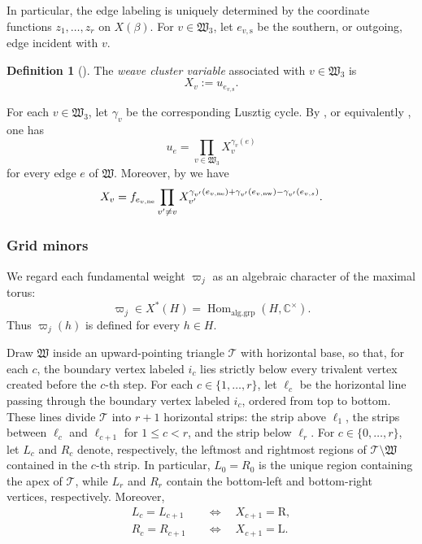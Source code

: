 \documentclass[12pt, reqno]{amsart}
\theoremstyle{plain}
\theoremstyle{definition}
\newtheorem{definition}[theorem]{Definition}
\numberwithin{equation}{section}
\begin{document}
In particular, the edge labeling is uniquely determined by the
coordinate functions \(z_1,\ldots,z_r\) on \(X(\beta)\).
 For \(v\in\mathfrak W_3\), let
\(e_{v,\mathrm{s}}\) be the southern, or outgoing, edge incident with
\(v\).

\begin{definition}[{\cite[Definition~4.4]{casals2025comparing}}]
\label{def:weave-cluster-variable}
The \emph{weave cluster variable} associated with
\(v\in\mathfrak W_3\) is
\[
    X_v
    :=
    u_{e_{v,\mathrm{s}}}.
\]
\end{definition}

For each \(v\in\mathfrak W_3\), let \(\gamma_v\) be the corresponding
Lusztig cycle. By
\cite[Theorem~5.12(i)]{casals2025cluster}, or equivalently
\cite[Theorem~4.19]{casals2025comparing}, one has
\begin{equation}\label{eq:u-factorization}
    u_e
    =
    \prod_{v\in\mathfrak W_3}
    X_v^{\gamma_v(e)}\end{equation}
for every edge \(e\) of \(\mathfrak W\). Moreover, by \cite[equation~(25)]{casals2025cluster} we have 
\begin{equation}
X_v=f_{e_{v,\rm ne}}\prod_{v'\neq v}X_{v'}^{\gamma_{v'}(e_{v,\rm ne})+\gamma_{v'}(e_{v,\rm nw})-\gamma_{v'}(e_{v,s})}.
\end{equation}

\subsubsection{Grid minors}

We regard each fundamental weight
\(\varpi_j\) as an algebraic character of the maximal torus:
\[
    \varpi_j
    \in
    X^*(H)
    =
    \operatorname{Hom}_{\mathrm{alg.grp}}
    (H,\mathbb{C}^{\times}).
\]
Thus \(\varpi_j(h)\) is defined for every \(h\in H\).

Draw \(\mathfrak W\) inside an upward-pointing triangle
\(\mathcal T\) with horizontal base, so that, for each \(c\), the
boundary vertex labeled \(i_c\) lies strictly below every trivalent
vertex created before the \(c\)-th step. For each
\(c\in\{1,\ldots,r\}\), let \(\ell_c\) be the horizontal line passing
through the boundary vertex labeled \(i_c\), ordered from top to
bottom. These lines divide \(\mathcal T\) into \(r+1\) horizontal
strips: the strip above \(\ell_1\), the strips between
\(\ell_c\) and \(\ell_{c+1}\) for \(1\leq c<r\), and the strip below
\(\ell_r\). For \(c\in\{0,\ldots,r\}\), let \(L_c\) and \(R_c\)
denote, respectively, the leftmost and rightmost regions of
\(\mathcal T\setminus\mathfrak W\) contained in the \(c\)-th strip. In particular, \(L_0=R_0\) is the unique region containing the
apex of \(\mathcal T\), while \(L_r\) and \(R_r\) contain the
bottom-left and bottom-right vertices, respectively. Moreover,
\begin{equation}\label{eq:left-right-regions}
\begin{aligned}
    L_c=L_{c+1}
    &\quad\Longleftrightarrow\quad
    X_{c+1}=\mathrm R,\\
    R_c=R_{c+1}
    &\quad\Longleftrightarrow\quad
    X_{c+1}=\mathrm L.
\end{aligned}
\end{equation}
\end{document}
